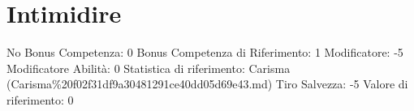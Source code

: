 \section{Intimidire}\label{intimidire}

\begin{description}
\tightlist
\item[Tags: ABI]
No Bonus Competenza: 0 Bonus Competenza di Riferimento: 1 Modificatore:
-5 Modificatore Abilità: 0 Statistica di riferimento: Carisma
(Carisma\%20f02f31df9a30481291ce40dd05d69e43.md) Tiro Salvezza: -5
Valore di riferimento: 0
\end{description}
